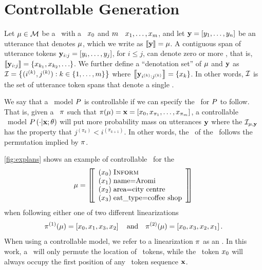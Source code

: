 \section{Controllable Generation}
\label{sec:nlgcg}

Let $\mu \in \mathcal{M}$ be a \meaningrepresentation~with a \dialogueact~$x_0$
and $m$ \attributevalues~$x_1,\ldots,x_{m}$, and let
$\mathbf{y} = \left[y_1,\ldots,y_n\right]$ be 
an utterance that denotes $\mu$, which we write as $\left\llbracket \mathbf{y} \right\rrbracket = \mu$.
A contiguous span of utterance tokens $\mathbf{y}_{i:j} = \left[y_i,\ldots,y_j\right]$, for $i \le j$, 
can denote zero or more \attributevalues, that is,
$\left\llbracket \mathbf{y}_{i:j} \right\rrbracket = \{x_{k_1}, x_{k_2}, \ldots\}$. We further define a ``denotation
set'' of $\mu$ and $\mathbf{y}$ as $\mathcal{I} = \left\{(i^{(k)},j^{(k)}): k \in \left\{1,\ldots,m\right\} \right\}$ where 
$\left\llbracket \mathbf{y}_{i^{(k)}:j^{(k)}} \right\rrbracket = \{ x_k \}$. In other words,
$\mathcal{I}$ is the set of utterance token spans that denote a single
\attributevalue.

We say that a \surfacerealization~model $P$ is controllable if 
we can specify the \surfacerealizationorder~for $P$ to follow. That is,
given a \linearizationstrategy~$\pi$ such that $\pi(\mu) = \mathbf{x} = \left[x_0, x_{\pi_1}, \ldots, x_{\pi_{m}}\right]$, a controllable
\surfacerealization~model $P\left(\cdot|\mathbf{x};\theta\right)$
will put more probability mass on utterances $\mathbf{y}$ where the 
$\mathcal{I}_{\mu,\mathbf{y}}$ has the property that $j^{(\pi_k)} < i^{(\pi_{k+1})}$. In other words, the \surfacerealizationorder~of the \attributevalues~follows the permutation implied by $\pi$.

\autoref{fig:explans} shows an example of controllable \surfacerealization~for the \meaningrepresentation
 \begingroup
 \renewcommand*\arraystretch{.6}
\begin{align} \mu =  \left[\!\!\left[ \begin{array}{l} (x_0)\; \textsc{Inform} \\ (x_1)\; \textrm{name=Aromi} \\ (x_2)\; \textrm{area=city centre} \\ (x_3)\; \textrm{eat\_type=coffee shop} \end{array} \right]\!\!\right]\label{eqn:mr1}\end{align}
\endgroup
when following either one of two different linearizations \[\pi^{(1)}(\mu) = \left[ x_0, x_1, x_3, x_2 \right]\quad \textrm{and} \quad \pi^{(2)}(\mu) = \left[ x_0, x_3, x_2, x_1 \right].\] When using a controllable model, 
we refer to a linearization $\pi$ as an \utteranceplan. In this work, 
a \linearizationstrategy~will only permute the location of \attributevalue~tokens, while the \dialogueact~token $x_0$ will always occupy the first
position of any \meaningrepresentation~token sequence $\mathbf{x}$. 



